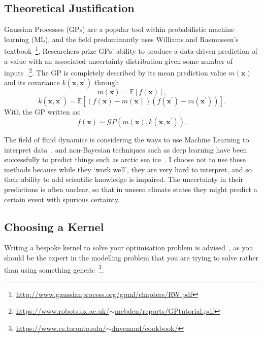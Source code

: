 \documentclass[usenames, dvipsnames, twocolumn]{article}
\begin{document}
\subsection{Theoretical Justification}


Gaussian Processes (GPs) are a popular tool within probabilistic machine learning (ML), and the field predominantly uses Williams and Rasmussen's textbook~\cite{williams2006gaussian}\footnote{\href{http://www.gaussianprocess.org/gpml/chapters/RW.pdf}{http://www.gaussianprocess.org/gpml/chapters/RW.pdf}},
Researchers prize GPs' ability to produce a data-driven prediction of a value with an associated uncertainty distribution given some number of inputs~\cite{ebden2008gaussian}.\footnote{ \href{https://www.robots.ox.ac.uk/~mebden/reports/GPtutorial.pdf}{https://www.robots.ox.ac.uk/$\sim$mebden/reports/GPtutorial.pdf}}. The GP is completely described by its mean prediction value \(m(\mathbf{x})\) and its covariance \(k\left(\mathbf{x}, \mathbf{x}^{\prime}\right)\) through
\begin{equation}m(\mathbf{x})=\mathbb{E}[f(\mathbf{x})], \end{equation}\begin{equation}k\left(\mathbf{x}, \mathbf{x}^{\prime}\right)=\mathbb{E}\left[(f(\mathbf{x})-m(\mathbf{x}))\left(f\left(\mathbf{x}^{\prime}\right)-m\left(\mathbf{x}^{\prime}\right)\right)\right].\end{equation}
With the GP written as:
\begin{equation}f(\mathbf{x}) \sim \mathcal{G} P\left(m(\mathbf{x}), k\left(\mathbf{x}, \mathbf{x}^{\prime}\right)\right). \end{equation}

The field of fluid dynamics is considering the ways to use
Machine Learning to interpret data~\cite{brenner2019perspective},
and non-Bayesian techniques such as deep learning
have been successfully to predict things such as arctic sea
ice~\cite{ham2019deep, bolton2019applications}.
I choose not to use these methods because while they `work
well', they are very hard to interpret, and so their ability to
add scientific knowledge is impaired. The uncertainty in their
predictions is often unclear, so that in unseen climate states
they might predict a certain event with spurious certainty.

\subsection{Choosing a Kernel}
Writing a bespoke kernel to solve your optimisation problem is advised~\cite{duvenaud2014automatic},
as you should be the expert in the modelling problem that you are trying to
solve rather than using something generic~\cite{LeMaitre2019gaussian,
 duvenaud2014automatic}\footnote{\href{https://www.cs.toronto.edu/~duvenaud/cookbook/
}{https://www.cs.toronto.edu/$\sim$duvenaud/cookbook/}}.
\end{document}
